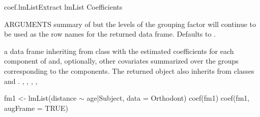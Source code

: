 \documentclass[pdftex]{article} \usepackage{url,graphicx}
\renewcommand{\Twiddle}{\mbox{\(\sim\)}}
\begin{document}
\begin{Helpfile}{coef.lmList}{Extract lmList Coefficients}
\begin{Argument}{ARGUMENTS}
summary of  but the levels of the grouping factor will
continue to be used as the row names for the returned data frame.
Defaults to .
\end{Argument}
a data frame inheriting from class  with the estimated
coefficients for each  component of  and,
optionally, other covariates summarized over the groups corresponding
to the  components. The returned object also inherits from
classes  and .
, ,
,
, 
\need 15pt
\vspace{-16pt}
\begin{Example}
fm1 <- lmList(distance {\Twiddle} age|Subject, data = Orthodont)
coef(fm1)
coef(fm1, augFrame = TRUE)
\end{Example}
\end{Helpfile}
\end{document}
